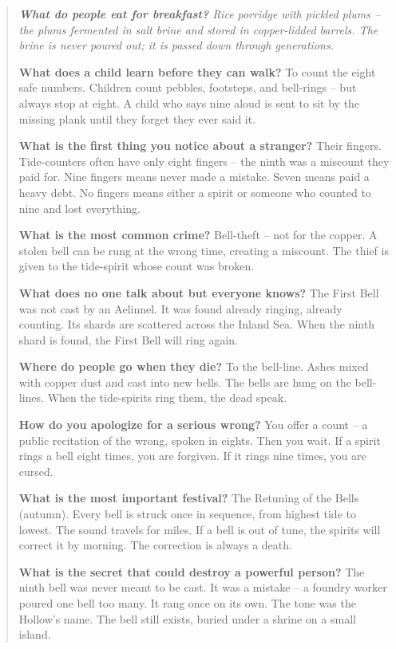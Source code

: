 \documentclass[12pt,oneside]{book}
\newenvironment{almanac}
  {\begin{quote}\small\itshape}
  {\end{quote}}
\begin{document}
\vspace{1em}
\begin{almanac}
\textbf{What do people eat for breakfast?} Rice porridge with pickled plums -- the plums fermented in salt brine and stored in copper-lidded barrels. The brine is never poured out; it is passed down through generations.

\textbf{What does a child learn before they can walk?} To count the eight safe numbers. Children count pebbles, footsteps, and bell-rings -- but always stop at eight. A child who says nine aloud is sent to sit by the missing plank until they forget they ever said it.

\textbf{What is the first thing you notice about a stranger?} Their fingers. Tide-counters often have only eight fingers -- the ninth was a miscount they paid for. Nine fingers means never made a mistake. Seven means paid a heavy debt. No fingers means either a spirit or someone who counted to nine and lost everything.

\textbf{What is the most common crime?} Bell-theft -- not for the copper. A stolen bell can be rung at the wrong time, creating a miscount. The thief is given to the tide-spirit whose count was broken.

\textbf{What does no one talk about but everyone knows?} The First Bell was not cast by an Aelinnel. It was found already ringing, already counting. Its shards are scattered across the Inland Sea. When the ninth shard is found, the First Bell will ring again.

\textbf{Where do people go when they die?} To the bell-line. Ashes mixed with copper dust and cast into new bells. The bells are hung on the bell-lines. When the tide-spirits ring them, the dead speak.

\textbf{How do you apologize for a serious wrong?} You offer a count -- a public recitation of the wrong, spoken in eights. Then you wait. If a spirit rings a bell eight times, you are forgiven. If it rings nine times, you are cursed.

\textbf{What is the most important festival?} The Retuning of the Bells (autumn). Every bell is struck once in sequence, from highest tide to lowest. The sound travels for miles. If a bell is out of tune, the spirits will correct it by morning. The correction is always a death.

\textbf{What is the secret that could destroy a powerful person?} The ninth bell was never meant to be cast. It was a mistake -- a foundry worker poured one bell too many. It rang once on its own. The tone was the Hollow's name. The bell still exists, buried under a shrine on a small island.
\end{almanac}
\end{document}
